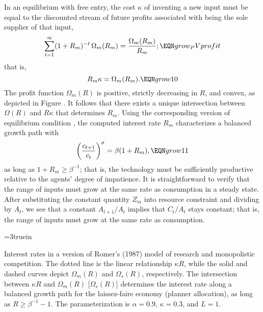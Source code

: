 In an equilibrium with free entry,
the cost $\kappa$ of inventing a new input must be equal
to the discounted stream of future profits associated with being the sole
supplier of that input,
$$
\sum_{t=1}^\infty (1+R_m)^{-t} \, \Omega_m(R_m) = {\Omega_m(R_m) \over R_m};
                                                            \EQN grow_PVprofit
$$
that is,
$$
R_m \kappa = \Omega_m(R_m).                                 \EQN grow10
$$
The profit function $\Omega_m(R)$ is positive, strictly decreasing in $R$,
and convex, as depicted in Figure . It follows that there
exists a unique intersection between $\Omega(R)$ and $R \kappa$ that
determines $R_m$. Using the corresponding version of equilibrium condition
, the computed interest rate $R_m$ characterizes a balanced growth
path with
$$
\left({c_{t+1} \over c_t}\right)^\sigma = \beta (1+R_m), \EQN grow11
$$
as long as $1+R_m\geq \beta^{-1}$; that is, the technology must be
sufficiently productive relative to the agents' degree of
impatience.
It is straightforward to verify that the range of inputs must grow at
the same rate as consumption in a steady state. After substituting the constant
quantity $Z_m$ into resource constraint  and dividing by $A_t$,
we see that a constant $A_{t+1}/A_t$ implies that $C_t/A_t$ stays constant;
that is, the range of inputs must grow at the same rate as consumption.


\centerline{\epsfxsize=3truein}
\caption{Interest rates in a version of Romer's (1987) model of research and
monopolistic competition.  The dotted line is the linear relationship $\kappa R$,
while the solid and dashed curves depict $\Omega_m(R)$ and $\Omega_s(R)$,
respectively. The intersection between $\kappa R$ and $\Omega_m(R)$ [$\Omega_s(R)$]
determines the interest rate along a balanced growth path for the laissez-faire
economy (planner allocation), as long as $R\geq \beta^{-1}-1$.  The
parameterization is $\alpha=0.9$, $\kappa=0.3$, and $L=1$.}
\endfigure


